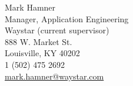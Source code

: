 Mark Hamner
  \\Manager, Application Engineering 
  \\ Waystar (current supervisor)
  \\ 888 W. Market St.
  \\ Louisville, KY 40202
  \\ 1 (502) 475 2692 
  \\ \href{mailto:mark.hamner@waystar.com}{mark.hamner@waystar.com}
